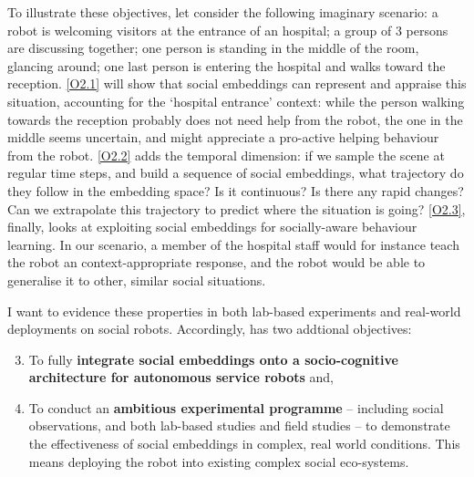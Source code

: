\noindent To illustrate these objectives, let consider the following imaginary
scenario: a robot is welcoming visitors at the entrance of an hospital; a group
of 3 persons are discussing together; one person is standing in the middle of
the room, glancing around; one last person is entering the hospital and
walks toward the reception. \ref{O2.1} will show that social embeddings can
represent and appraise this situation, accounting for the `hospital entrance' context: while
the person walking towards the reception probably does not need help from the
robot, the one in the middle seems uncertain, and might appreciate a pro-active
helping behaviour from the robot. \ref{O2.2} adds the temporal dimension: if we
sample the scene at regular time steps, and build a sequence of social
embeddings, what trajectory do they follow in the embedding space? Is it
continuous? Is there any rapid changes? Can we extrapolate this trajectory to
predict where the situation is going? \ref{O2.3}, finally, looks at exploiting
social embeddings for socially-aware behaviour learning. In our scenario, a
member of the hospital staff would for instance teach the robot an
context-appropriate response, and the robot would be able to generalise it to
other, similar social situations.


I want to evidence these properties in both lab-based experiments and
real-world deployments on social robots. Accordingly, \project has two addtional
objectives:

\begin{enumerate}[label=\textbf{O\arabic*}]
    \setcounter{enumi}{2}
    \item \label{O3} To fully {\bf integrate social embeddings onto a
        socio-cognitive architecture for autonomous service robots} and,

    \item \label{O4} To conduct an {\bf ambitious experimental programme} --
        including social observations, and both lab-based studies and field
        studies -- to demonstrate the effectiveness of social embeddings in
        complex, real world conditions.  This means deploying the \project robot
        into existing complex social eco-systems.
\end{enumerate}


%


